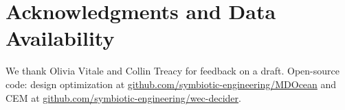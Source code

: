 \documentclass[10pt,twoside]{article}
\newif\ifplaceholder
\begin{document}


\section*{Acknowledgments and Data Availability}
We thank Olivia Vitale and Collin Treacy for feedback on a draft. Open-source code: design optimization at \url{github.com/symbiotic-engineering/MDOcean} and CEM at \url{github.com/symbiotic-engineering/wec-decider}.

\clearpage

\end{document}
